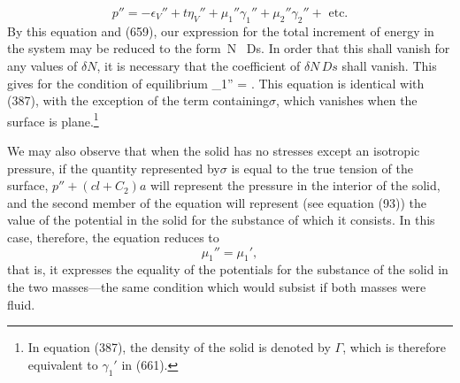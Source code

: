 \documentclass[12pt]{memoir}
\newcommand{\dd}{\delta}
\begin{document}
$$ p''= - \epsilon_V'' + t\eta_V'' + \mu_1''\gamma_1'' + \mu_2''\gamma_2'' + \text{ etc.} $$
By this equation and (659), our expression for the total increment of energy in the system may be reduced to the form
\eqs \int{} \,\dd N \, Ds.  \label{660}\eqe
In order that this shall vanish for any values of $\dd N$, it is necessary that the coefficient of $\dd N \, Ds$ shall vanish. This gives for the condition of equilibrium
\eqs \mu_1'' =   . \label{661}\eqe
This equation is identical with (387), with the exception of the term containing$\sigma$, which vanishes when the surface is plane.\footnote{In equation (387), the density of the solid is denoted by $\Gamma$, which is therefore equivalent to $\gamma_1'$ in (661).}

We may also observe that when the solid has no stresses except an isotropic pressure, if the quantity represented by$\sigma$ is equal to the true tension of the surface, $p''+(cl+C_2)a$ will represent the pressure in the interior of the solid, and the second member of the equation will represent (see equation (93)) the value of the potential in the solid for the substance of which it consists. In this case, therefore, the
equation reduces to
$$\mu_1''=\mu_1',$$
that is, it expresses the equality of the potentials for the substance of the solid in the two masses---the same condition which would subsist if both masses were fluid.
\end{document}

